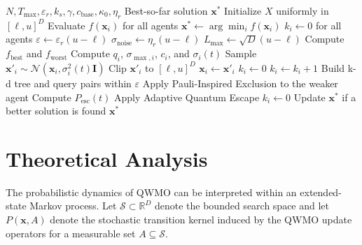 \documentclass[final,5p,times,twocolumn]{elsarticle}
\begin{document}
\begin{algorithm}[t]
\caption{QWMO}
\label{alg:qwmo}
\begin{algorithmic}[1]
\Require $N,T_{\max},\varepsilon_r,k_s,\gamma,c_{\mathrm{base}},\kappa_0,\eta_r$
\Ensure Best-so-far solution $\mathbf{x}^{*}$
\State Initialize $X$ uniformly in $[\ell,u]^D$
\State Evaluate $f(\mathbf{x}_i)$ for all agents
\State $\mathbf{x}^{*}\gets \arg\min_i f(\mathbf{x}_i)$
\State $k_i\gets 0$ for all agents
\State $\varepsilon\gets \varepsilon_r(u-\ell)$
\State $\sigma_{\mathrm{noise}}\gets \eta_r(u-\ell)$
\State $L_{\max}\gets \sqrt{D}(u-\ell)$
    \State Compute $f_{\mathrm{best}}$ and $f_{\mathrm{worst}}$
        \State Compute $q_i$, $\sigma_{\max,i}$, $c_i$, and $\sigma_i(t)$
        \State Sample $\mathbf{x}'_i\sim\mathcal{N}(\mathbf{x}_i,\sigma_i^2(t)\mathbf{I})$
        \State Clip $\mathbf{x}'_i$ to $[\ell,u]^D$
            \State $\mathbf{x}_i\gets \mathbf{x}'_i$
            \State $k_i\gets 0$
        \Else
            \State $k_i\gets k_i+1$
        \EndIf
    \EndFor
    \State Build k-d tree and query pairs within $\varepsilon$
        \State Apply Pauli-Inspired Exclusion to the weaker agent
    \EndFor
        \State Compute $P_{\mathrm{esc}}(t)$
            \State Apply Adaptive Quantum Escape
            \State $k_i\gets 0$
        \EndIf
    \EndFor
    \State Update $\mathbf{x}^{*}$ if a better solution is found
\EndFor
\State \Return $\mathbf{x}^{*}$
\end{algorithmic}
\end{algorithm}


\section{Theoretical Analysis}
\label{sec:theory}

The probabilistic dynamics of QWMO can be interpreted within
an extended-state Markov process. Let
$\mathcal{S}\subset\mathbb{R}^D$ denote the bounded search
space and let $P(\mathbf{x},A)$ denote the stochastic
transition kernel induced by the QWMO update operators for
a measurable set $A\subseteq\mathcal{S}$.
\end{document}
